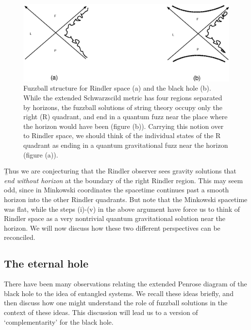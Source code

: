 \documentclass[12pt]{article}
\begin{document}
\begin{figure}[htbp]
\begin{center}
\includegraphics[scale=.75]{fn11.eps}
\caption{{Fuzzball structure for Rindler space (a) and the black hole (b). While the extended Schwarzscild metric has four regions separated by horizons, the fuzzball solutions of string theory occupy only the right (R) quadrant, and end in a quantum fuzz near the place where the horizon would have been (figure (b)). Carrying this notion over to Rindler space, we should think of the individual states of the R quadrant as ending in a quantum gravitational fuzz near the horizon (figure (a)).}}
\label{fn11}
\end{center}
\end{figure}


\b

Thus we are conjecturing that the Rindler observer sees gravity solutions that {\it end without horizon} at the boundary of the 
right Rindler region. This may seem odd, since in Minkowski coordinates the spacetime continues past a smooth horizon into the other Rindler quadrants. But note that the Minkowski spacetime was flat, while the steps (i)-(v) in the above argument have force us to think of Rindler space as a very nontrivial quantum gravitational solution near the horizon. We will now discuss how these two different perspectives can be reconciled.

\subsection{The eternal hole}


There have been many observations relating the extended Penrose diagram of the black hole to the idea of entangled systems. We recall these ideas briefly, and then discuss how one might understand the role of fuzzball solutions in the context of these ideas. This discussion will lead us to a version of `complementarity' for the black hole.
\end{document}
